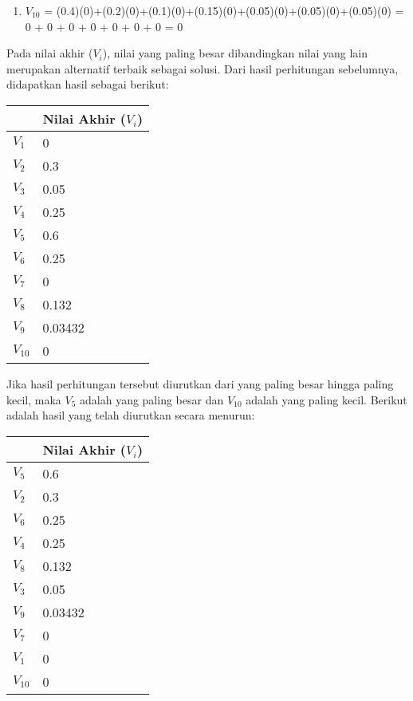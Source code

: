 \documentclass[a4paper,twoside]{article}
\begin{document}
\begin{enumerate}
\begin{enumerate}
	\item $V_{10}$ = (0.4)(0)+(0.2)(0)+(0.1)(0)+(0.15)(0)+(0.05)(0)+(0.05)(0)+(0.05)(0) = 0 + 0 + 0 + 0 + 0 + 0 + 0 = 0
\end{enumerate}

Pada nilai akhir ($V_{i}$), nilai yang paling besar dibandingkan nilai yang lain merupakan alternatif terbaik sebagai solusi. Dari hasil perhitungan sebelumnya, didapatkan hasil sebagai berikut:

\begin{center}
    \begin{tabular}{| l | l | }
    \hline
     & Nilai Akhir ($V_{i}$)  \\ \hline
   $V_{1}$ & 0  \\ \hline
   $V_{2}$ & 0.3   \\ \hline
	 $V_{3}$ & 0.05  \\ \hline
   $V_{4}$ & 0.25   \\ \hline
	 $V_{5}$ & 0.6  \\ \hline
   $V_{6}$ & 0.25   \\ \hline
	 $V_{7}$ & 0  \\ \hline
   $V_{8}$ & 0.132   \\ \hline
	 $V_{9}$ & 0.03432  \\ \hline
   $V_{10}$ & 0   \\ 
    \hline
    \end{tabular}
\end{center}

Jika hasil perhitungan tersebut diurutkan dari yang paling besar hingga paling kecil, maka $V_{5}$ adalah yang paling besar dan $V_{10}$ adalah yang paling kecil. Berikut adalah hasil yang telah diurutkan secara menurun:

\begin{center}
    \begin{tabular}{| l | l | }
    \hline
     & Nilai Akhir ($V_{i}$)  \\ \hline
  $V_{5}$ &  0.6  \\ \hline 
	$V_{2}$ & 0.3  \\ \hline
	$V_{6}$ & 0.25   \\ \hline
	$V_{4}$ & 0.25  \\ \hline
	$V_{8}$ & 0.132  \\ \hline
	$V_{3}$ & 0.05   \\ \hline
	$V_{9}$ & 0.03432  \\ \hline
	$V_{7}$ & 0   \\ \hline
   $V_{1}$ & 0   \\ \hline	 
   $V_{10}$ & 0   \\ 
	     \hline
    \end{tabular}
\end{center}



\end{enumerate}
\end{document}
